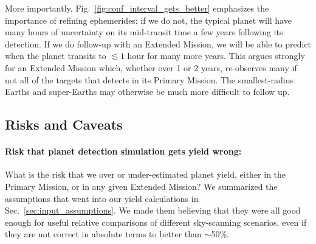 More importantly, Fig.~\ref{fig:conf_interval_gets_better} emphasizes the importance of refining \tesss ephemerides: if we do not, the typical \tess planet will have many hours of uncertainty on its mid-transit time a few years following its detection.
If we do follow-up with an Extended Mission, we will be able to predict when 
the planet transits to $\lesssim1$ hour for many more years.
This argues strongly for an Extended Mission which, whether over 1 or 2 years, re-observes many if not all of the targets that \tess detects in its Primary Mission. 
The smallest-radius Earths and super-Earths may otherwise be much more 
difficult to follow up.


\subsection{Risks and Caveats}
\label{sec:risks_caveats}
\paragraph{Risk that planet detection simulation gets yield wrong:}
What is the risk that we over or under-estimated \tesss planet yield, either in the Primary Mission, or in any given Extended Mission?
We summarized the assumptions that went into our yield calculations in Sec.~\ref{sec:input_assumptions}.
We made them believing that they were all good enough for useful relative comparisons of different sky-scanning scenarios,
even if they are not correct in absolute terms to better than $\sim$50\%.

